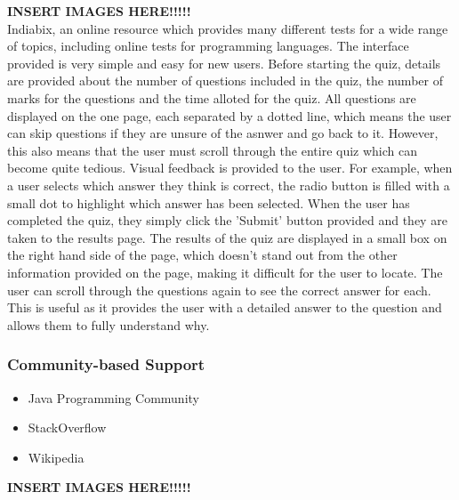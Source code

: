 \documentclass{article}
\begin{document}
\textbf{INSERT IMAGES HERE!!!!!}\\

Indiabix, an online resource which provides many different tests for a wide range of topics, including online tests for programming languages. The interface provided is very simple and easy for new users. Before starting the quiz, details are provided about the number of questions included in the quiz, the number of marks for the questions and the time alloted for the quiz. All questions are displayed on the one page, each separated by a dotted line, which means the user can skip questions if they are unsure of the asnwer and go back to it. However, this also means that the user must scroll through the entire quiz which can become quite tedious. Visual feedback is provided to the user. For example, when a user selects which answer they think is correct, the radio button is filled with a small dot to highlight which answer has been selected. When the user has completed the quiz, they simply click the 'Submit' button provided and they are taken to the results page. The results of the quiz are displayed in a small box on the right hand side of the page, which doesn't stand out from the other information provided on the page, making it difficult for the user to locate. The user can scroll through the questions again to see the correct answer for each. This is useful as it provides the user with a detailed answer to the question and allows them to fully understand why.\\

\subsubsection{Community-based Support}

\begin{itemize}
\item Java Programming Community
\item StackOverflow
\item Wikipedia
\end{itemize}

\textbf{INSERT IMAGES HERE!!!!!}\\
\end{document}
